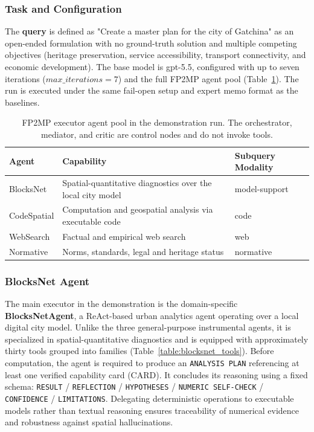 \subsubsection{Task and Configuration}

The \textbf{query} is defined as "Create a master plan for the city of Gatchina" as an open-ended formulation with no ground-truth solution and multiple competing objectives (heritage preservation, service accessibility, transport connectivity, and economic development).
The base model is gpt-5.5, configured with up to seven iterations ($max\_iterations=7$) and the full FP2MP agent pool (Table~\ref{table:demonstration_agents}).
The run is executed under the same fail-open setup and expert memo format as the baselines.

\begin{table}[h]
\centering
\small
\begin{tabular}{lll}
\hline
\textbf{Agent} & \textbf{Capability} & \textbf{Subquery Modality} \\
\hline
BlocksNet   & Spatial-quantitative diagnostics over the local city model & model-support \\
CodeSpatial & Computation and geospatial analysis via executable code & code \\
WebSearch   & Factual and empirical web search & web \\
Normative   & Norms, standards, legal and heritage status & normative \\
\hline
\end{tabular}
\caption{FP2MP executor agent pool in the demonstration run. The orchestrator, mediator, and critic are control nodes and do not invoke tools.}
\label{table:demonstration_agents}
\end{table}

\subsubsection{BlocksNet Agent}

The main executor in the demonstration is the domain-specific \textbf{BlocksNetAgent}, a ReAct-based urban analytics agent operating over a local digital city model.
Unlike the three general-purpose instrumental agents, it is specialized in spatial-quantitative diagnostics and is equipped with approximately thirty tools grouped into families (Table~\ref{table:blocksnet_tools}).
Before computation, the agent is required to produce an \texttt{ANALYSIS PLAN} referencing at least one verified capability card (CARD).
It concludes its reasoning using a fixed schema: \texttt{RESULT} / \texttt{REFLECTION} / \texttt{HYPOTHESES} / \texttt{NUMERIC SELF-CHECK} / \texttt{CONFIDENCE} / \texttt{LIMITATIONS}.
Delegating deterministic operations to executable models rather than textual reasoning ensures traceability of numerical evidence and robustness against spatial hallucinations.


